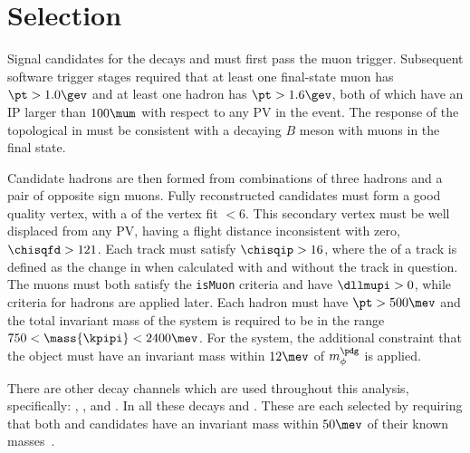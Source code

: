 \section{Selection}

Signal candidates for the decays \btokpipimumu and \btophikmumu must first pass the \lone muon
trigger.
Subsequent software trigger stages required that at least one final-state muon has $\pt>1.0\gev$
and at least one hadron has $\pt>1.6\gev$, both of which have an IP larger than $100\mum$ with
respect to any PV in the event.
The response of the topological \BBDT in \hlttwo must be consistent with a decaying $B$ meson
with muons in the final state.


Candidate \Bp hadrons are then formed from combinations of three hadrons and a pair of opposite
sign muons.
Fully reconstructed candidates must form a good quality vertex, with a \chisq of the vertex fit
$<6$.
This secondary vertex must be well displaced from any PV, having a flight distance inconsistent
with zero, $\chisqfd>121$.
Each track must satisfy $\chisqip>16$, where the \chisqip of a track is defined as the change in
\chisqip when calculated with and without the track in question.
The muons must both satisfy the {\tt isMuon} criteria and have $\dllmupi>0$,
while \pid criteria for hadrons are applied later.
Each hadron must have $\pt>500\mev$ and
the total invariant mass of the \kpipi system is required to be in the range
$750<\mass{\kpipi}<2400\mev$.
For the \phik system, the additional constraint that the \decay{\phi}{\kk} object must have an
invariant mass within $12\mev$ of $m_\phi^\pdg$ is applied.

There are other decay channels which are used throughout this analysis, specifically:
\btojpsikpipi, \btopsitwosk, and \btojpsiphik.
In all these decays \psitwostojpsipipi and \jpsitomumu.
These are each selected by requiring that both \jpsi and \psitwos candidates have an invariant
mass within $50\mev$ of their known masses~\cite{PDG2012}.



